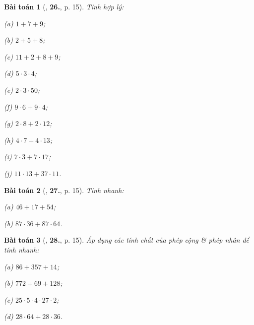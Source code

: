 \documentclass{article}
\numberwithin{equation}{section}
\newtheorem{baitoan}{Bài toán}[section]
\begin{document}
\begin{baitoan}[\cite{Trong_Toan_6_2021}, \textbf{26.}, p. 15]
	Tính hợp lý:
	\begin{enumerate*}
		\item[(a)] $1 + 7 + 9$;
		\item[(b)] $2 + 5 + 8$;
		\item[(c)] $11 + 2 + 8 + 9$;
		\item[(d)] $5\cdot 3\cdot 4$;
		\item[(e)] $2\cdot 3\cdot 50$;
		\item[(f)] $9\cdot 6 + 9\cdot 4$;
		\item[(g)] $2\cdot 8 + 2\cdot 12$;
		\item[(h)] $4\cdot 7 + 4 \cdot 13$;
		\item[(i)] $7\cdot 3 + 7\cdot 17$;
		\item[(j)] $11\cdot 13 + 37\cdot 11$.
	\end{enumerate*}
\end{baitoan}

\begin{baitoan}[\cite{Trong_Toan_6_2021}, \textbf{27.}, p. 15]
	Tính nhanh:
	\begin{enumerate*}
		\item[(a)] $46 + 17 + 54$;
		\item[(b)] $87\cdot 36 + 87\cdot 64$.
	\end{enumerate*}
\end{baitoan}

\begin{baitoan}[\cite{Trong_Toan_6_2021}, \textbf{28.}, p. 15]
	Áp dụng các tính chất của phép cộng \& phép nhân để tính nhanh:
	\begin{enumerate*}
		\item[(a)] $86 + 357 + 14$;
		\item[(b)] $772 + 69 + 128$;
		\item[(c)] $25\cdot 5\cdot 4\cdot 27\cdot 2$;
		\item[(d)] $28\cdot 64 + 28\cdot 36$.
	\end{enumerate*}
\end{baitoan}
\end{document}
